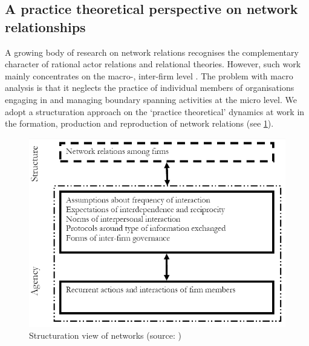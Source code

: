 \documentclass[graybox]{styles/svmult}
\begin{document}
\subsection{A practice theoretical perspective on network relationships}
A growing body of research on network relations recognises the complementary character of rational actor relations and relational theories. However, such work mainly concentrates on the macro-, inter-firm level \citep{schultze2004practice}. The problem with macro analysis is that it neglects the practice of individual members of organisations engaging in and managing boundary spanning activities at the micro level.
We adopt a structuration approach \citep{Gid1984aa} on the `practice theoretical' dynamics at work in the formation, production and reproduction of network relations (see \ref{fig:structuration}). 


%
\begin{figure}[b]
\includegraphics[width=\textwidth]{figs/structuration.png}
%
%
\caption{Structuration view of networks (source: \citep[p. 89]{schultze2004practice})}
\label{fig:structuration}       %
\end{figure}
\end{document}
